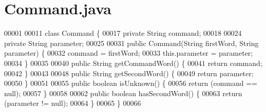 \hypertarget{Command_8java_source}{\section{Command.\-java}
}

\begin{DoxyCode}
00001 
00011 \textcolor{keyword}{class }Command \{
00017     \textcolor{keyword}{private} String command;
00018 
00024     \textcolor{keyword}{private} String parameter;
00025 
00031     \textcolor{keyword}{public} Command(String firstWord, String parameter) \{
00032         command = firstWord;
00033         this.parameter = parameter;
00034     \}
00035 
00040     \textcolor{keyword}{public} String getCommandWord() \{
00041         \textcolor{keywordflow}{return} command;
00042     \}
00043 
00048     \textcolor{keyword}{public} String getSecondWord() \{
00049         \textcolor{keywordflow}{return} parameter;
00050     \}
00051 
00055     \textcolor{keyword}{public} \textcolor{keywordtype}{boolean} isUnknown() \{
00056         \textcolor{keywordflow}{return} (command == null);
00057     \}
00058 
00062     \textcolor{keyword}{public} \textcolor{keywordtype}{boolean} hasSecondWord() \{
00063         \textcolor{keywordflow}{return} (parameter != null);
00064     \}
00065 \}
00066 
\end{DoxyCode}
